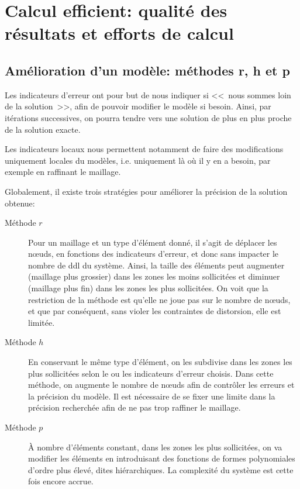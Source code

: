 \chapter{Calcul efficient: qualité des résultats et efforts de calcul}\label{Ch-Amelio}


\medskip
\section{Amélioration d'un modèle: méthodes r, h et p}\label{Sec-rhp}

Les indicateurs d'erreur ont pour but de nous indiquer si <<~nous sommes loin de
la solution~>>, afin de pouvoir modifier le modèle si besoin.
Ainsi, par itérations successives, on pourra tendre vers une solution
de plus en plus proche de la solution exacte.

Les indicateurs locaux nous permettent notamment de faire des modifications uniquement
locales du modèles, i.e. uniquement là où il y en a besoin, par exemple en
raffinant le maillage.

\medskip
Globalement, il existe trois stratégies pour améliorer la précision de la
solution obtenue:
\begin{description}
\item[Méthode $r$] Pour un maillage et un type d'élément donné, il s'agit de déplacer les nœuds, en fonctions des indicateurs d'erreur, et donc sans impacter le nombre de ddl du système. Ainsi, la taille des éléments peut augmenter (maillage plus grossier) dans les zones les moins sollicitées et diminuer (maillage plus fin) dans les zones les plus sollicitées. On voit que la restriction de la méthode est qu'elle ne joue pas sur le nombre de nœuds, et que par conséquent, sans violer les contraintes de distorsion, elle est limitée.
\item[Méthode $h$] En conservant le même type d'élément, on les subdivise dans les zones les plus sollicitées selon le ou les indicateurs d'erreur choisis. Dans cette méthode, on augmente le nombre de nœuds afin de contrôler les erreurs et la précision du modèle. Il est nécessaire de se fixer une limite dans la précision recherchée afin de ne pas trop raffiner le maillage.
\item[Méthode $p$] À nombre d'éléments constant, dans les zones les plus sollicitées, on va modifier les éléments en introduisant des fonctions de formes polynomiales d'ordre plus élevé, dites hiérarchiques. La complexité du système est cette fois encore accrue.
\end{description}

